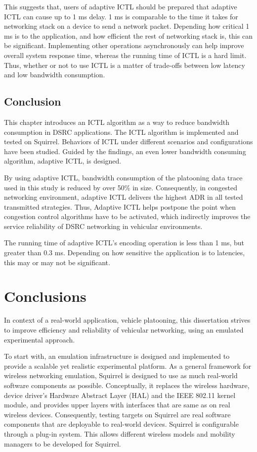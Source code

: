 \documentclass[12pt]{report}
\begin{document}
This suggests that, users of adaptive ICTL should be prepared that adaptive ICTL can cause up to 1 ms delay. 1 ms is comparable to the time it takes for networking stack on a device to send a network packet. Depending how critical 1 ms is to the application, and how efficient the rest of networking stack is, this can be significant. Implementing other operations asynchronously can help improve overall system response time, whereas the running time of ICTL is a hard limit. Thus, whether or not to use ICTL is a matter of trade-offs between low latency and low bandwidth consumption.

\section{Conclusion}

This chapter introduces an ICTL algorithm as a way to reduce bandwidth consumption in DSRC applications. The ICTL algorithm is implemented and tested on Squirrel. Behaviors of ICTL under different scenarios and configurations have been studied. Guided by the findings, an even lower bandwidth consuming algorithm, adaptive ICTL, is designed.

By using adaptive ICTL, bandwidth consumption of the platooning data trace used in this study is reduced by over 50\% in size. Consequently, in congested networking environment, adaptive ICTL delivers the highest ADR in all tested transmitted strategies. Thus, Adaptive ICTL helps postpone the point when congestion control algorithms have to be activated, which indirectly improves the service reliability of DSRC networking in vehicular environments.

The running time of adaptive ICTL's encoding operation is less than 1 ms, but greater than 0.3 ms. Depending on how sensitive the application is to latencies, this may or may not be significant.

\chapter{Conclusions}

In context of a real-world application, vehicle platooning, this dissertation strives to improve efficiency and reliability of vehicular networking, using an emulated experimental approach.

To start with, an emulation infrastructure is designed and implemented to provide a scalable yet realistic experimental platform. As a general framework for wireless networking emulation, Squirrel is designed to use as much real-world software components as possible. Conceptually, it replaces the wireless hardware, device driver's Hardware Abstract Layer (HAL) and the IEEE 802.11 kernel module, and provides upper layers with interfaces that are same as on real wireless devices. Consequently, testing targets on Squirrel are real software components that are deployable to real-world devices. Squirrel is configurable through a plug-in system. This allows different wireless models and mobility managers to be developed for Squirrel.
\end{document}
